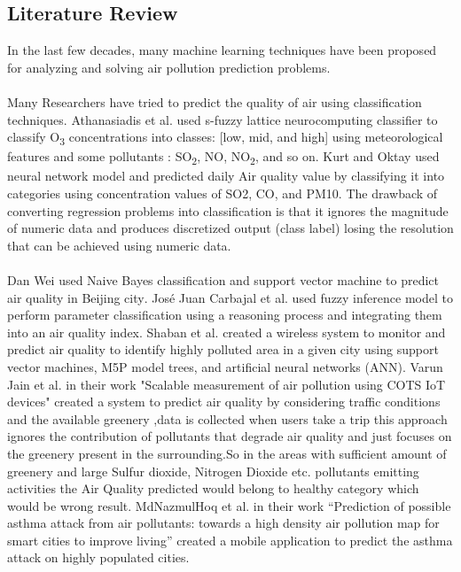 \documentclass{article}
\begin{document}
\subsection{\color{brown} Literature Review}  

\begin{itemize}
In the last few decades, many machine learning techniques
have been proposed for analyzing and solving air pollution prediction problems. \\ \\
Many Researchers have tried to predict the quality of air using classification techniques. 
Athanasiadis et al. used s-fuzzy lattice neurocomputing classifier to classify O\textsubscript{3} concentrations into classes: [low, mid, and high] using meteorological features and some
pollutants : SO\textsubscript{2}, NO, NO\textsubscript{2}, and so on\textsuperscript{\cite{ref8}}. Kurt and Oktay used neural network model and predicted daily Air quality value by classifying it into categories using concentration values of SO2, CO, and PM10\textsuperscript{\cite{ref9}}. The drawback of converting regression problems into classification is that it ignores the magnitude of numeric data and produces discretized output (class label) losing the resolution that can be achieved using numeric data.\\ \\
Dan Wei used Naive Bayes classification and support vector machine to predict air quality in Beijing city\textsuperscript{\cite{ref10}}.
José Juan Carbajal et al. used fuzzy inference model to perform parameter classification using a reasoning process and integrating them into an air quality index\textsuperscript{\cite{ref11}}.
Shaban et al. created a wireless system to monitor and predict air quality to identify highly polluted area in a given city using support vector machines, M5P model trees, and artificial neural networks (ANN)\textsuperscript{\cite{ref14}}. Varun Jain et al. in their work "Scalable measurement of air pollution using COTS IoT devices" created a system to predict air quality by considering traffic conditions and the available greenery ,data is collected when users take a trip\textsuperscript{\cite{ref15}} this approach ignores the contribution of pollutants that degrade air quality and just focuses on the greenery present in the surrounding.So in the areas with sufficient amount of greenery and large Sulfur dioxide, Nitrogen Dioxide etc. pollutants emitting activities the Air Quality predicted would belong to healthy category which would be wrong result. MdNazmulHoq et al. in their work “Prediction of possible asthma attack from air pollutants: towards a high density air pollution map for smart cities to improve living” created a mobile application to predict the asthma attack on highly populated cities\textsuperscript{\cite{ref16}}.\\ \\

\end{itemize}
\end{document}
